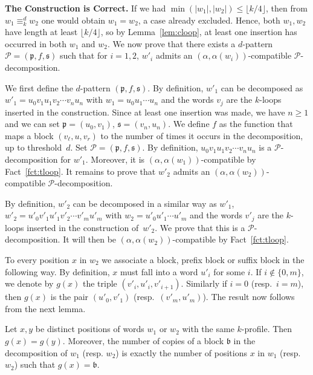 \documentclass{LMCS}
\newcommand\Ps{\ensuremath{\mathcal{P}}\xspace}
\newcommand\kloops{$k$-loops\xspace}
\newcommand\profile[1]{$#1$-profile\xspace}
\newcommand\ltteq[2]{\ensuremath{\equiv_{#1}^{#2}}\xspace}
\newcommand\decop[1]{\ensuremath{#1}-decomposition\xspace}
\newcommand\pfsdecomp{\decop{\Ps}}
\newcommand\frb{\ensuremath{\mathfrak{b}}\xspace}
\newcommand\frp{\ensuremath{\mathfrak{p}}\xspace}
\newcommand\frs{\ensuremath{\mathfrak{s}}\xspace}
\let\le\leqslant
\let\geq\geqslant
\theoremstyle{plain}
\begin{document}
\medskip
\noindent
{\bf The Construction is Correct.} If we had
$\min(|w_1|,|w_2|)\le\lfloor k/4\rfloor$, then from $w_1 \ltteq{k}{d} 
w_2$ one would obtain $w_1=w_2$, a case already
excluded. Hence, both $w_1,w_2$ have length at least $\lfloor
k/4\rfloor$, so by Lemma~\ref{lem:cloop}, at least one insertion has
occurred in both $w_1$ and $w_2$.  We now prove that
there exists a $d$-pattern $\Ps=(\frp,f,\frs)$ such that for $i=1,2$,
$w'_i$ admits an $(\alpha,\alpha(w_i))$-compatible \pfsdecomp. 

We first define the $d$-pattern $(\frp,f,\frs)$. By definition, $w'_1$
can be decomposed as $w'_1 = u_0v_1u_1v_2 \cdots v_{n}u_n$ with
$w_1=u_0u_1\cdots u_n$ and the words $v_j$ are the \kloops inserted in
the construction. Since at least one insertion was made, we have $n
\geq 1$ and we can set $\frp = (u_0,v_1)$, $\frs = (v_n,u_n)$.  We
define $f$ as the function that maps a block $(v_\ell,u,v_r)$ to the
number of times it occurs in the decomposition, up to
threshold~$d$. Set $\Ps=(\frp,f,\frs)$.  By definition, $u_0v_1u_1v_2
\cdots v_{n}u_n$ is a \pfsdecomp for $w'_1$. Moreover, it is
$(\alpha,\alpha(w_1))$-compatible by Fact~\ref{fct:tloop}. It
remains to prove that $w'_2$ admits an
$(\alpha,\alpha(w_2))$-compatible \pfsdecomp.

By definition, $w'_2$ can be decomposed in a similar way as $w'_1$, 
$w'_2 = u'_0v'_1u'_1v'_2 \cdots v'_{m}u'_m$ with $w_2=u'_0u'_1\cdots
u'_m$ and the words $v'_j$ are the \kloops inserted in the
construction of~$w'_2$. We prove that this is a \pfsdecomp. It will then be
$(\alpha,\alpha(w_2))$-compatible by Fact~\ref{fct:tloop}.

To every position $x$ in $w_2$ we associate a block, prefix block or
suffix block in the following way. By definition, $x$ must fall into a
word $u'_i$ for some $i$. If $i \notin \{0,m\}$, we denote by $g(x)$
the triple $(v'_i,u'_i,v'_{i+1})$. Similarly if $i=0$ (resp.~$i=m$),
then $g(x)$ is the pair $(u'_0,v'_{1})$ (resp.~$(v'_m,u'_{m})$). The
result now follows from the next lemma.

\begin{lem} \label{lem:blockscst} Let $x,y$ be distinct positions of
  words $w_1$ or $w_2$ with the same \profile{k}. Then
  $g(x)=g(y)$. Moreover, the number of copies of a block \frb in the
  decomposition of $w_1$ (resp. $w_2$) is exactly the number of
  positions $x$ in $w_1$ (resp. $w_2$) such that $g(x)=\frb$.
\end{lem}
\end{document}

